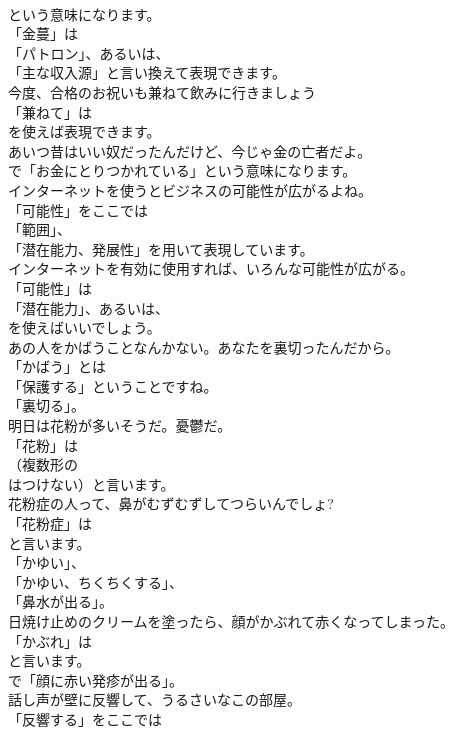 \documentclass[8pt]{extreport}
\begin{document}
\begin{CJK}{UTF8}{min}
\\	という意味になります。	
\\	「金蔓」は
\\	「パトロン」、あるいは、
\\	「主な収入源」と言い換えて表現できます。	
\\	今度、合格のお祝いも兼ねて飲みに行きましょう 
\\	「兼ねて」は
\\	を使えば表現できます。	
\\	あいつ昔はいい奴だったんだけど、今じゃ金の亡者だよ。 
\\	で「お金にとりつかれている」という意味になります。	
\\	インターネットを使うとビジネスの可能性が広がるよね。 
\\	「可能性」をここでは
\\	「範囲」、
\\	「潜在能力、発展性」を用いて表現しています。	
\\	インターネットを有効に使用すれば、いろんな可能性が広がる。 
\\	「可能性」は
\\	「潜在能力」、あるいは、
\\	を使えばいいでしょう。	
\\	あの人をかばうことなんかない。あなたを裏切ったんだから。 
\\	「かばう」とは
\\	「保護する」ということですね。
\\	「裏切る」。	
\\	明日は花粉が多いそうだ。憂鬱だ。 
\\	「花粉」は
\\	（複数形の
\\	はつけない）と言います。	
\\	花粉症の人って、鼻がむずむずしてつらいんでしょ? 
\\	「花粉症」は
\\	と言います。
\\	「かゆい」、
\\	「かゆい、ちくちくする」、
\\	「鼻水が出る」。	
\\	日焼け止めのクリームを塗ったら、顔がかぶれて赤くなってしまった。 
\\	「かぶれ」は
\\	と言います。
\\	で「顔に赤い発疹が出る」。	
\\	話し声が壁に反響して、うるさいなこの部屋。 
\\	「反響する」をここでは

\end{CJK}
\end{document}
